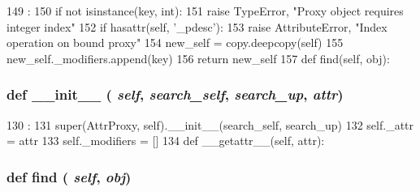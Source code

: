 \begin{DoxyCode}
149                               :
150         if not isinstance(key, int):
151             raise TypeError, "Proxy object requires integer index"
152         if hasattr(self, '_pdesc'):
153             raise AttributeError, "Index operation on bound proxy"
154         new_self = copy.deepcopy(self)
155         new_self._modifiers.append(key)
156         return new_self
157 
    def find(self, obj):
\end{DoxyCode}
\hypertarget{classm5_1_1proxy_1_1AttrProxy_ac775ee34451fdfa742b318538164070e}{
\subsubsection[{\_\-\_\-init\_\-\_\-}]{\setlength{\rightskip}{0pt plus 5cm}def \_\-\_\-init\_\-\_\- ( {\em self}, \/   {\em search\_\-self}, \/   {\em search\_\-up}, \/   {\em attr})}}
\label{classm5_1_1proxy_1_1AttrProxy_ac775ee34451fdfa742b318538164070e}



\begin{DoxyCode}
130                                                     :
131         super(AttrProxy, self).__init__(search_self, search_up)
132         self._attr = attr
133         self._modifiers = []
134 
    def __getattr__(self, attr):
\end{DoxyCode}
\hypertarget{classm5_1_1proxy_1_1AttrProxy_a01f90f57b7acd55e177611f5d0f7df23}{
\subsubsection[{find}]{\setlength{\rightskip}{0pt plus 5cm}def find ( {\em self}, \/   {\em obj})}}
\label{classm5_1_1proxy_1_1AttrProxy_a01f90f57b7acd55e177611f5d0f7df23}



